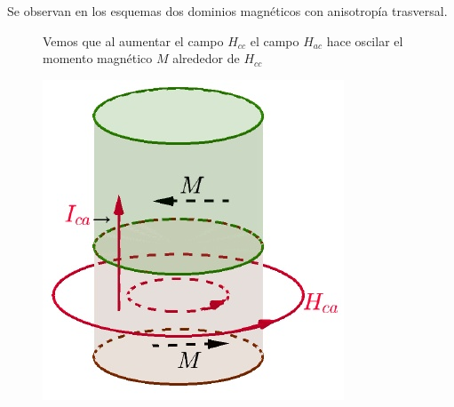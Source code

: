 Se observan en los esquemas dos dominios magnéticos con anisotropía trasversal.

\begin{figure}[H]
  \begin{minipage}[b]{0.47\textwidth}
 Vemos que al aumentar el campo $H_{cc}$ el campo $H_{ac}$ hace oscilar el momento magnético $M$ alrededor de $H_{cc}$
  \vspace{1cm}
  \end{minipage}
  \hfill
  \begin{minipage}[b]{0.47\textwidth}
     \includegraphics[width=0.8\textwidth]{./Figures/fig326}
	\label{fig:326}
  \end{minipage}
\end{figure}

